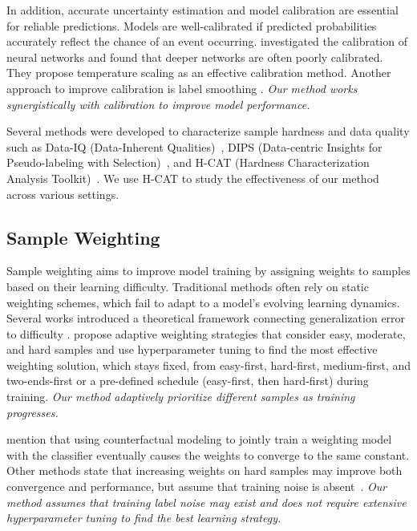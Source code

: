 \documentclass{article}
\theoremstyle{plain}
\theoremstyle{definition}
\theoremstyle{remark}
\begin{document}
In addition, accurate uncertainty estimation and model calibration are essential for reliable predictions. Models are well-calibrated if predicted probabilities accurately reflect the chance of an event occurring. \citet{guo_calibration_2017} investigated the calibration of neural networks and found that deeper networks are often poorly calibrated. They propose temperature scaling as an effective calibration method. Another approach to improve calibration is label smoothing \citep{muller_when_2020}. \textit{Our method works synergistically with calibration to improve model performance.}

Several methods were developed to characterize sample hardness and data quality such as Data-IQ (Data-Inherent Qualities)~\cite{seedat_data-iq_2022}, DIPS (Data-centric Insights for Pseudo-labeling with Selection)~\cite{seedat_you_2024}, and H-CAT (Hardness Characterization Analysis Toolkit)~\cite{seedat_dissecting_2024}. We use H-CAT to study the effectiveness of our method across various settings.

\subsection{Sample Weighting}
\label{sec:sampleweighting}
Sample weighting aims to improve model training by assigning weights to samples based on their learning difficulty. Traditional methods often rely on static weighting schemes, which fail to adapt to a model's evolving learning dynamics. Several works introduced a theoretical framework connecting generalization error to difficulty \citep{zhou_which_2023, zhou_understanding_2023, zhu_exploring_2022}. \citet{zhou_which_2023} propose adaptive weighting strategies that consider easy, moderate, and hard samples and use hyperparameter tuning to find the most effective weighting solution, which stays fixed, from easy-first, hard-first, medium-first, and two-ends-first or a pre-defined schedule (easy-first, then hard-first) during training. \textit{Our method adaptively prioritize different samples as training progresses.}

\citet{xu_understanding_2021} mention that using counterfactual modeling to jointly train a weighting model with the classifier eventually causes the weights to converge to the same constant. Other methods state that increasing weights on hard samples may improve both convergence and performance, but assume that training noise is absent~\citep{zhou_understanding_2023, xu_understanding_2021}. \textit{Our method assumes that training label noise may exist and does not require extensive hyperparameter tuning to find the best learning strategy.}
\end{document}
